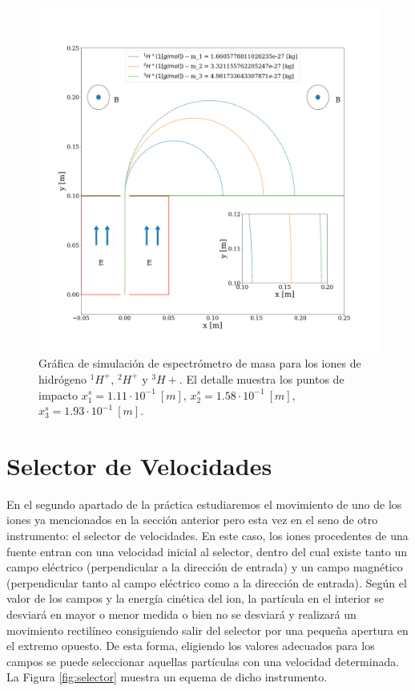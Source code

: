 \documentclass[journal]{IEEEtran}
\begin{document}
\begin{figure}[!htb]
    \includegraphics[width=\linewidth]{espectrometro_simulacion}
    \caption{Gráfica de simulación de espectrómetro de masa para los iones de hidrógeno $^1H^+$, $^2H^+$ y $^3H+$. El detalle muestra los puntos de impacto $x^s_1 = 1.11\cdot 10^{-1}~[m]$, $x^s_2 = 1.58\cdot 10^{-1}~[m]$, $x^s_3 = 1.93\cdot 10^{-1}~[m]$.}
    \label{fig:espectrometro_simulacion}
\end{figure}

\newpage

\section{Selector de Velocidades}
\label{sec:selector}

En el segundo apartado de la práctica estudiaremos el movimiento de uno de los iones ya mencionados en la sección anterior pero esta vez en el seno de otro instrumento: el selector de velocidades. En este caso, los iones procedentes de una fuente entran con una velocidad inicial al selector, dentro del cual existe tanto un campo eléctrico (perpendicular a la dirección de entrada) y un campo magnético (perpendicular tanto al campo eléctrico como a la dirección de entrada). Según el valor de los campos y la energía cinética del ion, la partícula en el interior se desviará en mayor o menor medida o bien no se desviará y realizará un movimiento rectilíneo consiguiendo salir del selector por una pequeña apertura en el extremo opuesto. De esta forma, eligiendo los valores adecuados para los campos se puede seleccionar aquellas partículas con una velocidad determinada. La Figura \ref{fig:selector} muestra un equema de dicho instrumento.
\end{document}
